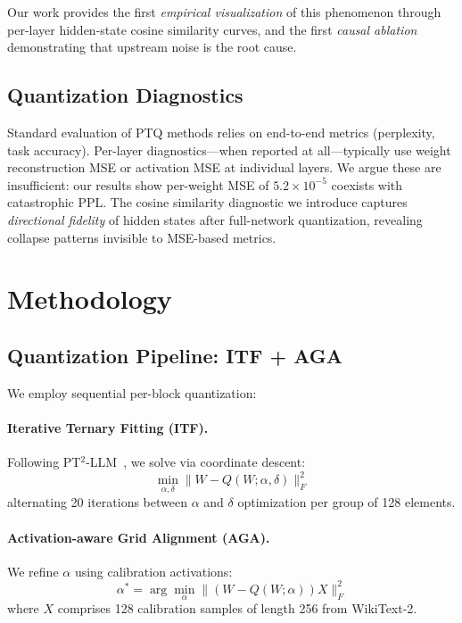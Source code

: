 \documentclass[10pt,a4paper]{article}
\begin{document}
Our work provides the first \textit{empirical visualization} of this phenomenon through per-layer hidden-state cosine similarity curves, and the first \textit{causal ablation} demonstrating that upstream noise is the root cause.

\subsection{Quantization Diagnostics}

Standard evaluation of PTQ methods relies on end-to-end metrics (perplexity, task accuracy).
Per-layer diagnostics---when reported at all---typically use weight reconstruction MSE or activation MSE at individual layers.
We argue these are insufficient: our results show per-weight MSE of $5.2\times10^{-5}$ coexists with catastrophic PPL.
The cosine similarity diagnostic we introduce captures \textit{directional fidelity} of hidden states after full-network quantization, revealing collapse patterns invisible to MSE-based metrics.

\section{Methodology}
\label{sec:method}

\subsection{Quantization Pipeline: ITF + AGA}

We employ sequential per-block quantization:

\paragraph{Iterative Ternary Fitting (ITF).}
Following PT$^2$-LLM~\citep{pt2llm2025}, we solve via coordinate descent:
\begin{equation}
    \min_{\alpha, \delta} \| W - Q(W; \alpha, \delta) \|_F^2
\end{equation}
alternating 20 iterations between $\alpha$ and $\delta$ optimization per group of 128 elements.

\paragraph{Activation-aware Grid Alignment (AGA).}
We refine $\alpha$ using calibration activations:
\begin{equation}
    \alpha^* = \arg\min_\alpha \| (W - Q(W;\alpha)) X \|_F^2
\end{equation}
where $X$ comprises 128 calibration samples of length 256 from WikiText-2.
\end{document}
